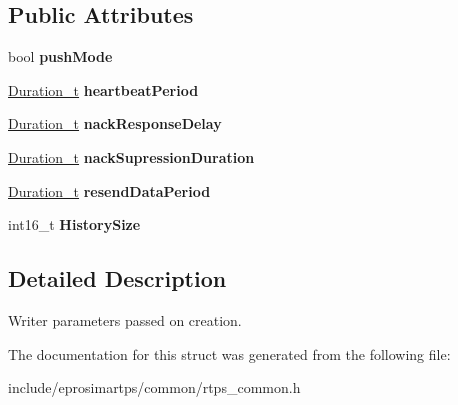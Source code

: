 \subsection*{\-Public \-Attributes}
\begin{DoxyCompactItemize}
\item 
\hypertarget{structeprosima_1_1rtps_1_1_writer_params_a59f303da1b7faea4bbecbb1b46db964d}{bool {\bfseries push\-Mode}}\label{structeprosima_1_1rtps_1_1_writer_params_a59f303da1b7faea4bbecbb1b46db964d}

\item 
\hypertarget{structeprosima_1_1rtps_1_1_writer_params_aa265997ae4b959f99c72fa062a19d2cb}{\hyperlink{structeprosima_1_1rtps_1_1_time__t}{\-Duration\-\_\-t} {\bfseries heartbeat\-Period}}\label{structeprosima_1_1rtps_1_1_writer_params_aa265997ae4b959f99c72fa062a19d2cb}

\item 
\hypertarget{structeprosima_1_1rtps_1_1_writer_params_af4ae9794f6e380a419f9da5481a5e588}{\hyperlink{structeprosima_1_1rtps_1_1_time__t}{\-Duration\-\_\-t} {\bfseries nack\-Response\-Delay}}\label{structeprosima_1_1rtps_1_1_writer_params_af4ae9794f6e380a419f9da5481a5e588}

\item 
\hypertarget{structeprosima_1_1rtps_1_1_writer_params_af4fe2b849e68c927bdce5d72dc1c04a4}{\hyperlink{structeprosima_1_1rtps_1_1_time__t}{\-Duration\-\_\-t} {\bfseries nack\-Supression\-Duration}}\label{structeprosima_1_1rtps_1_1_writer_params_af4fe2b849e68c927bdce5d72dc1c04a4}

\item 
\hypertarget{structeprosima_1_1rtps_1_1_writer_params_a33b59096e36aaaecafd347f96f516edb}{\hyperlink{structeprosima_1_1rtps_1_1_time__t}{\-Duration\-\_\-t} {\bfseries resend\-Data\-Period}}\label{structeprosima_1_1rtps_1_1_writer_params_a33b59096e36aaaecafd347f96f516edb}

\item 
\hypertarget{structeprosima_1_1rtps_1_1_writer_params_a18cf1b021837037a2d8b40de9b186ec8}{int16\-\_\-t {\bfseries \-History\-Size}}\label{structeprosima_1_1rtps_1_1_writer_params_a18cf1b021837037a2d8b40de9b186ec8}

\end{DoxyCompactItemize}


\subsection{\-Detailed \-Description}
\-Writer parameters passed on creation. 

\-The documentation for this struct was generated from the following file\-:\begin{DoxyCompactItemize}
\item 
include/eprosimartps/common/rtps\-\_\-common.\-h\end{DoxyCompactItemize}
